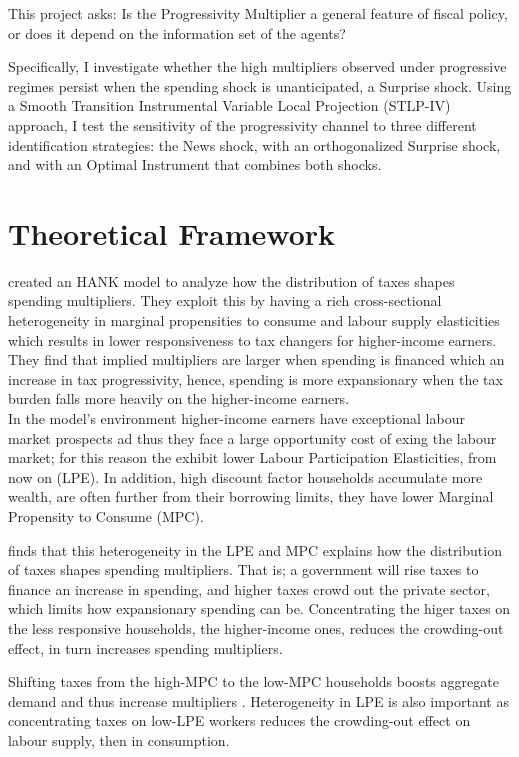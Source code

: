 \documentclass[12pt,letterpaper]{article}
\begin{document}
This project asks: Is the Progressivity Multiplier a general feature of fiscal policy, or does it depend on the information set of the agents?

    Specifically, I investigate whether the high multipliers observed under progressive regimes persist when the spending shock is unanticipated, a Surprise shock. Using a Smooth Transition Instrumental Variable Local Projection (STLP-IV) approach, I test the sensitivity of the progressivity channel to three different identification strategies: the \cite{RameyZubairy2018} News shock, with an orthogonalized \cite{BP} Surprise shock, and with an Optimal Instrument that combines both shocks.




\section{Theoretical Framework}
\cite{FN} created an HANK model to analyze how the distribution of taxes shapes spending multipliers. They exploit this by having a rich cross-sectional heterogeneity in marginal propensities to consume and labour supply elasticities which results in lower responsiveness to tax changers for higher-income earners.
\\ 
They find that implied multipliers are larger when spending is financed which an increase in tax progressivity, hence, spending is more expansionary when the tax burden falls more heavily on the higher-income earners.
\\
In the model's environment higher-income earners have exceptional labour market prospects ad thus they face a large opportunity cost of exing the labour market; for this reason the exhibit lower Labour Participation Elasticities, from now on (LPE).
In addition, high discount factor households accumulate more wealth, are often further from their borrowing limits, they have lower Marginal Propensity to Consume (MPC).

\cite{FN} finds that this heterogeneity in the LPE and MPC explains how the distribution of taxes shapes spending multipliers.
That is; a government will rise taxes to finance an increase in spending, and higher taxes crowd out the private sector, which limits how expansionary spending can be. 
Concentrating the higer taxes on the less responsive households, the higher-income ones, reduces the crowding-out effect, in turn increases spending multipliers.

Shifting taxes from the high-MPC to the low-MPC households boosts aggregate demand and thus increase multipliers \cite{FN}.
Heterogeneity in LPE is also important as concentrating taxes on low-LPE workers reduces the crowding-out effect on labour supply, then in consumption.
\end{document}
